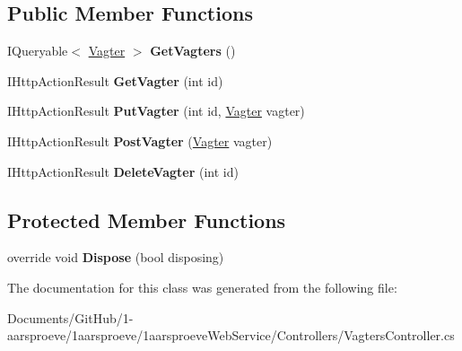 \subsection*{Public Member Functions}
\begin{DoxyCompactItemize}
\item 
\hypertarget{class__1aarsproeve_web_service_1_1_controllers_1_1_vagters_controller_a8ba2055a16b211f8c90cb5a82001fe62}{}I\+Queryable$<$ \hyperlink{class__1aarsproeve_web_service_1_1_vagter}{Vagter} $>$ {\bfseries Get\+Vagters} ()\label{class__1aarsproeve_web_service_1_1_controllers_1_1_vagters_controller_a8ba2055a16b211f8c90cb5a82001fe62}

\item 
\hypertarget{class__1aarsproeve_web_service_1_1_controllers_1_1_vagters_controller_ad365b16d480d9b56bf2f6fc339203b38}{}I\+Http\+Action\+Result {\bfseries Get\+Vagter} (int id)\label{class__1aarsproeve_web_service_1_1_controllers_1_1_vagters_controller_ad365b16d480d9b56bf2f6fc339203b38}

\item 
\hypertarget{class__1aarsproeve_web_service_1_1_controllers_1_1_vagters_controller_a64afd762bb63e303fcc53c8c7243a2c3}{}I\+Http\+Action\+Result {\bfseries Put\+Vagter} (int id, \hyperlink{class__1aarsproeve_web_service_1_1_vagter}{Vagter} vagter)\label{class__1aarsproeve_web_service_1_1_controllers_1_1_vagters_controller_a64afd762bb63e303fcc53c8c7243a2c3}

\item 
\hypertarget{class__1aarsproeve_web_service_1_1_controllers_1_1_vagters_controller_a87087c5a4006cf73b805670e464c6d80}{}I\+Http\+Action\+Result {\bfseries Post\+Vagter} (\hyperlink{class__1aarsproeve_web_service_1_1_vagter}{Vagter} vagter)\label{class__1aarsproeve_web_service_1_1_controllers_1_1_vagters_controller_a87087c5a4006cf73b805670e464c6d80}

\item 
\hypertarget{class__1aarsproeve_web_service_1_1_controllers_1_1_vagters_controller_afbae83f29ecb73f2ab3c5eff1d85e0c4}{}I\+Http\+Action\+Result {\bfseries Delete\+Vagter} (int id)\label{class__1aarsproeve_web_service_1_1_controllers_1_1_vagters_controller_afbae83f29ecb73f2ab3c5eff1d85e0c4}

\end{DoxyCompactItemize}
\subsection*{Protected Member Functions}
\begin{DoxyCompactItemize}
\item 
\hypertarget{class__1aarsproeve_web_service_1_1_controllers_1_1_vagters_controller_a76269c3556178139d123bb89419cc4e3}{}override void {\bfseries Dispose} (bool disposing)\label{class__1aarsproeve_web_service_1_1_controllers_1_1_vagters_controller_a76269c3556178139d123bb89419cc4e3}

\end{DoxyCompactItemize}


The documentation for this class was generated from the following file\+:\begin{DoxyCompactItemize}
\item 
Documents/\+Git\+Hub/1-\/aarsproeve/1aarsproeve/1aarsproeve\+Web\+Service/\+Controllers/Vagters\+Controller.\+cs\end{DoxyCompactItemize}
